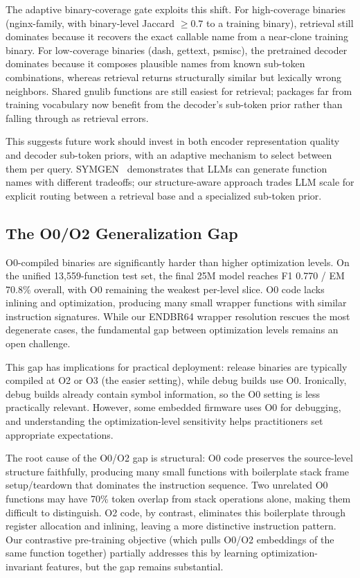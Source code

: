 \documentclass[sigconf,nonacm]{acmart}
\begin{document}
The adaptive binary-coverage gate exploits this shift. For high-coverage binaries (nginx-family, with binary-level Jaccard $\ge 0.7$ to a training binary), retrieval still dominates because it recovers the exact callable name from a near-clone training binary. For low-coverage binaries (dash, gettext, psmisc), the pretrained decoder dominates because it composes plausible names from known sub-token combinations, whereas retrieval returns structurally similar but lexically wrong neighbors. Shared gnulib functions are still easiest for retrieval; packages far from training vocabulary now benefit from the decoder's sub-token prior rather than falling through as retrieval errors.

This suggests future work should invest in both encoder representation quality and decoder sub-token priors, with an adaptive mechanism to select between them per query. SYMGEN~\cite{symgen} demonstrates that LLMs can generate function names with different tradeoffs; our structure-aware approach trades LLM scale for explicit routing between a retrieval base and a specialized sub-token prior.

\subsection{The O0/O2 Generalization Gap}

O0-compiled binaries are significantly harder than higher optimization levels. On the unified 13,559-function test set, the final 25M model reaches F1 0.770 / EM 70.8\% overall, with O0 remaining the weakest per-level slice. O0 code lacks inlining and optimization, producing many small wrapper functions with similar instruction signatures. While our ENDBR64 wrapper resolution rescues the most degenerate cases, the fundamental gap between optimization levels remains an open challenge.

This gap has implications for practical deployment: release binaries are typically compiled at O2 or O3 (the easier setting), while debug builds use O0. Ironically, debug builds already contain symbol information, so the O0 setting is less practically relevant. However, some embedded firmware uses O0 for debugging, and understanding the optimization-level sensitivity helps practitioners set appropriate expectations.

The root cause of the O0/O2 gap is structural: O0 code preserves the source-level structure faithfully, producing many small functions with boilerplate stack frame setup/teardown that dominates the instruction sequence. Two unrelated O0 functions may have 70\% token overlap from stack operations alone, making them difficult to distinguish. O2 code, by contrast, eliminates this boilerplate through register allocation and inlining, leaving a more distinctive instruction pattern. Our contrastive pre-training objective (which pulls O0/O2 embeddings of the same function together) partially addresses this by learning optimization-invariant features, but the gap remains substantial.
\end{document}
